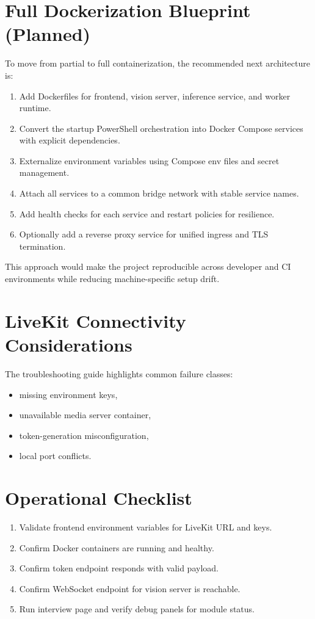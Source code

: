 \documentclass[12pt,a4paper]{report}
\begin{document}
\section{Full Dockerization Blueprint (Planned)}
To move from partial to full containerization, the recommended next architecture is:
\begin{enumerate}[leftmargin=1.5em]
\item Add Dockerfiles for frontend, vision server, inference service, and worker runtime.
\item Convert the startup PowerShell orchestration into Docker Compose services with explicit dependencies.
\item Externalize environment variables using Compose env files and secret management.
\item Attach all services to a common bridge network with stable service names.
\item Add health checks for each service and restart policies for resilience.
\item Optionally add a reverse proxy service for unified ingress and TLS termination.
\end{enumerate}

This approach would make the project reproducible across developer and CI environments while reducing machine-specific setup drift.

\section{LiveKit Connectivity Considerations}
The troubleshooting guide highlights common failure classes:
\begin{itemize}[leftmargin=1.5em]
\item missing environment keys,
\item unavailable media server container,
\item token-generation misconfiguration,
\item local port conflicts.
\end{itemize}

\section{Operational Checklist}
\begin{enumerate}[leftmargin=1.5em]
\item Validate frontend environment variables for LiveKit URL and keys.
\item Confirm Docker containers are running and healthy.
\item Confirm token endpoint responds with valid payload.
\item Confirm WebSocket endpoint for vision server is reachable.
\item Run interview page and verify debug panels for module status.
\end{enumerate}
\end{document}

